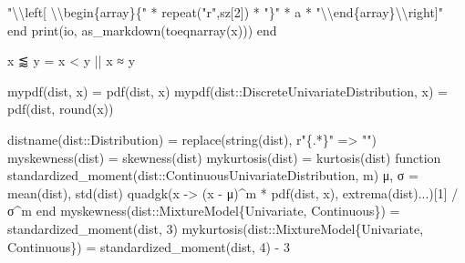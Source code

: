\documentclass[
  letterpaper,
  DIV=11,
  numbers=noendperiod]{scrartcl}
\newenvironment{Shaded}{\begin{snugshade}}{\end{snugshade}}
\newcommand{\DataTypeTok}[1]{\textcolor[rgb]{0.68,0.00,0.00}{#1}}
\newcommand{\FloatTok}[1]{\textcolor[rgb]{0.68,0.00,0.00}{#1}}
\newcommand{\FunctionTok}[1]{\textcolor[rgb]{0.28,0.35,0.67}{#1}}
\newcommand{\KeywordTok}[1]{\textcolor[rgb]{0.00,0.23,0.31}{#1}}
\newcommand{\NormalTok}[1]{\textcolor[rgb]{0.00,0.23,0.31}{#1}}
\newcommand{\OperatorTok}[1]{\textcolor[rgb]{0.37,0.37,0.37}{#1}}
\newcommand{\SpecialCharTok}[1]{\textcolor[rgb]{0.37,0.37,0.37}{#1}}
\newcommand{\StringTok}[1]{\textcolor[rgb]{0.13,0.47,0.30}{#1}}
\begin{document}
\begin{Shaded}
\begin{Highlighting}[]
        \StringTok{"}\SpecialCharTok{\textbackslash{}\textbackslash{}}\StringTok{left[ }\SpecialCharTok{\textbackslash{}\textbackslash{}}\StringTok{begin\{array\}\{"} \OperatorTok{*} \FunctionTok{repeat}\NormalTok{(}\StringTok{"r"}\NormalTok{,sz[}\FloatTok{2}\NormalTok{]) }\OperatorTok{*} \StringTok{"\}"} \OperatorTok{*}\NormalTok{ a }\OperatorTok{*} \StringTok{"}\SpecialCharTok{\textbackslash{}\textbackslash{}}\StringTok{end\{array\}}\SpecialCharTok{\textbackslash{}\textbackslash{}}\StringTok{right]"}
    \KeywordTok{end}
    \FunctionTok{print}\NormalTok{(io, }\FunctionTok{as\_markdown}\NormalTok{(}\FunctionTok{toeqnarray}\NormalTok{(x)))}
\KeywordTok{end}
\end{Highlighting}
\end{Shaded}

\begin{Shaded}
\begin{Highlighting}[]
\NormalTok{x }\OperatorTok{⪅}\NormalTok{ y }\OperatorTok{=}\NormalTok{ x }\OperatorTok{\textless{}}\NormalTok{ y }\OperatorTok{||}\NormalTok{ x }\OperatorTok{≈}\NormalTok{ y}

\FunctionTok{mypdf}\NormalTok{(dist, x) }\OperatorTok{=} \FunctionTok{pdf}\NormalTok{(dist, x)}
\FunctionTok{mypdf}\NormalTok{(dist}\OperatorTok{::}\DataTypeTok{DiscreteUnivariateDistribution}\NormalTok{, x) }\OperatorTok{=} \FunctionTok{pdf}\NormalTok{(dist, }\FunctionTok{round}\NormalTok{(x))}

\FunctionTok{distname}\NormalTok{(dist}\OperatorTok{::}\DataTypeTok{Distribution}\NormalTok{) }\OperatorTok{=} \FunctionTok{replace}\NormalTok{(}\FunctionTok{string}\NormalTok{(dist), }\StringTok{r"\{}\SpecialCharTok{.*}\StringTok{\}"} \OperatorTok{=\textgreater{}} \StringTok{""}\NormalTok{)}
\FunctionTok{myskewness}\NormalTok{(dist) }\OperatorTok{=} \FunctionTok{skewness}\NormalTok{(dist)}
\FunctionTok{mykurtosis}\NormalTok{(dist) }\OperatorTok{=} \FunctionTok{kurtosis}\NormalTok{(dist)}
\KeywordTok{function} \FunctionTok{standardized\_moment}\NormalTok{(dist}\OperatorTok{::}\DataTypeTok{ContinuousUnivariateDistribution}\NormalTok{, m)}
\NormalTok{    μ, σ }\OperatorTok{=} \FunctionTok{mean}\NormalTok{(dist), }\FunctionTok{std}\NormalTok{(dist)}
    \FunctionTok{quadgk}\NormalTok{(x }\OperatorTok{{-}\textgreater{}}\NormalTok{ (x }\OperatorTok{{-}}\NormalTok{ μ)}\OperatorTok{\^{}}\NormalTok{m }\OperatorTok{*} \FunctionTok{pdf}\NormalTok{(dist, x), }\FunctionTok{extrema}\NormalTok{(dist)}\OperatorTok{...}\NormalTok{)[}\FloatTok{1}\NormalTok{] }\OperatorTok{/}\NormalTok{ σ}\OperatorTok{\^{}}\NormalTok{m}
\KeywordTok{end}
\FunctionTok{myskewness}\NormalTok{(dist}\OperatorTok{::}\DataTypeTok{MixtureModel\{Univariate, Continuous\}}\NormalTok{) }\OperatorTok{=} \FunctionTok{standardized\_moment}\NormalTok{(dist, }\FloatTok{3}\NormalTok{)}
\FunctionTok{mykurtosis}\NormalTok{(dist}\OperatorTok{::}\DataTypeTok{MixtureModel\{Univariate, Continuous\}}\NormalTok{) }\OperatorTok{=} \FunctionTok{standardized\_moment}\NormalTok{(dist, }\FloatTok{4}\NormalTok{) }\OperatorTok{{-}} \FloatTok{3}
\end{Highlighting}
\end{Shaded}
\end{document}
